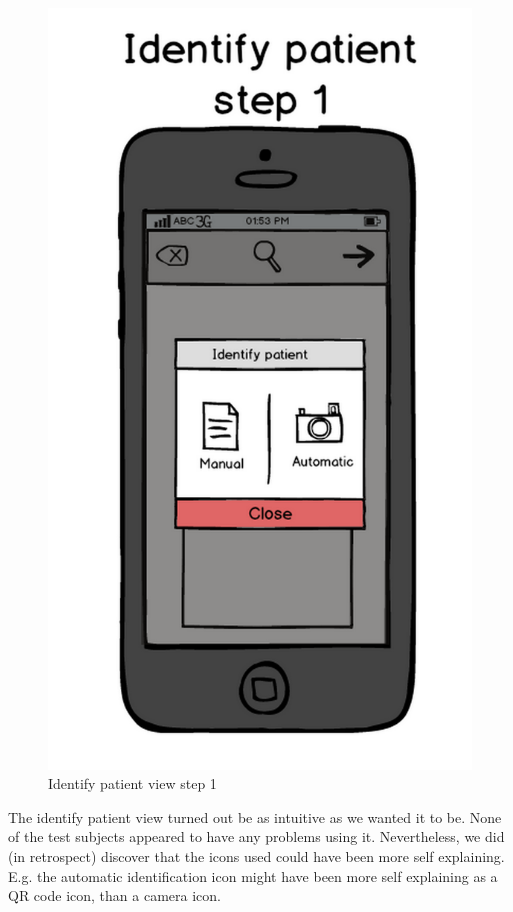 \begin{figure}[H]
\centering
\includegraphics[scale=0.20]{img/mockups/identify_patient_1.png}
\caption{Identify patient view step 1}
\label{identifymock1}
\end{figure}
The identify patient view turned out be as intuitive as we wanted it to be. None of the test subjects appeared to have any problems using it. Nevertheless, we did (in retrospect) discover that the icons used could have been more self explaining. E.g. the automatic identification icon might have been more self explaining as a QR code icon, than a camera icon.

